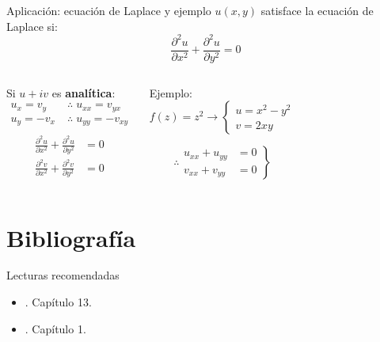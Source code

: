 \documentclass[9pt, aspectratio=169]{beamer}
\begin{document}
\begin{frame}{Aplicación: ecuación de Laplace y ejemplo}
$u(x, y)$ satisface la ecuación de Laplace si: 
\[\boxed{ \frac{\partial^2 u}{\partial x^2} + \frac{\partial^2 u}{\partial y^2} = 0 } \] \pause
\vspace{1em}

\begin{columns}[t]
 \cx
 Si $u + i v$ es \textbf{analítica}:
 \begin{align*}
  u_x = v_y \; &\therefore \; u_{xx} = v_{yx} \\
  u_y = -v_x \; &\therefore \; u_{yy} = -v_{xy} \\
 \end{align*} \vspace{-3em}
 \begin{align*}
  \frac{\partial^2 u}{\partial x^2} + \frac{\partial^2 u}{\partial y^2} &= 0 \\
  \frac{\partial^2 v}{\partial x^2} + \frac{\partial^2 v}{\partial y^2} &= 0
 \end{align*} \pause

 \cx
 \begin{exampleblock}{Ejemplo:}
 \[ f(z) = z^2 \longrightarrow 
 \begin{cases}
  u = x^2 - y^2 \\
  v = 2 x y
 \end{cases}
\]

\[
\therefore \left. { \begin{array}{ll}
                   u_{xx} + u_{yy} &= 0 \\
                   v_{xx} + v_{yy} &= 0 
                  \end{array} }
            \right\}
\]
 \end{exampleblock}
\end{columns}
\end{frame}


\section*{Bibliografía}
\begin{frame}[allowframebreaks]{Lecturas recomendadas}
\begin{itemize}
 \item {}. Capítulo 13.
 \item {}. Capítulo 1.
\end{itemize}

\end{frame}
\end{document}
